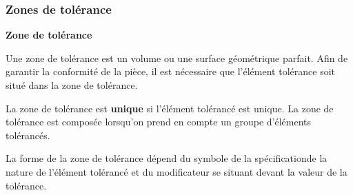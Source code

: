 \documentclass[11pt,oneside]{article}
\begin{document}
\subsubsection{Zones de tolérance}
\begin{defi}
\textbf{Zone de tolérance}

Une zone de tolérance est un volume ou une surface géométrique parfait. Afin de garantir la conformité de la pièce, il est nécessaire que l'élément tolérance soit situé dans la zone de tolérance.

La zone de tolérance est \textbf{unique} si l'élément tolérancé est unique. La zone de tolérance est composée lorsqu'on prend en compte un groupe d'éléments tolérancés. 

La forme de la zone de tolérance dépend du symbole de la spécificationde la nature de l'élément tolérancé et du modificateur se situant devant la valeur de la tolérance. 
\end{defi}
\end{document}
